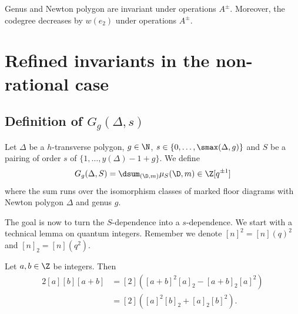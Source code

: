 \begin{lemm}\label{lem-opeAB}
Genus and Newton polygon are invariant under operations $A^\pm$. Moreover, the codegree decreases by $w(e_2)$ under operations $A^\pm$.
\end{lemm}




\section{Refined invariants in the non-rational case}

\subsection{Definition of \texorpdfstring{$G_g(\Delta,s)$}{G\_g(Delta, s)}}



\begin{defi} \label{def-GDeltaS}
Let $\Delta$ be a $h$-transverse polygon, $g\in\N$, $s\in \{0,\dots,\smax(\Delta,g)\}$ and $S$ be a pairing  of order $s$ of $\{1,\dots, y(\Delta)-1+g \}$. We define 
\[ G_g(\Delta,S) = \dsum_{(\D,m)} \mu_S(\D,m) \in \Z[q^{\pm1}]  \]
where the sum runs over the isomorphism classes of marked floor diagrams with Newton polygon $\Delta$ and genus $g$.
\end{defi}

The goal is now to turn the $S$-dependence into a $s$-dependence. We start with a technical lemma on quantum integers. Remember we denote $[n]^2 = [n](q)^2$ and $[n]_2 = [n](q^2)$. 

\begin{lemm}\label{lem-quantum} 
Let $a,b \in\Z$ be integers. Then 
\begin{align*}
2[a][b][a+b] &= [2]\left( [a+b]^2 [a]_2 - [a+b]_2 [a]^2 \right) \\
 &= [2] \left([a]^2[b]_2 + [a]_2 [b]^2 \right).
\end{align*}
\end{lemm}

